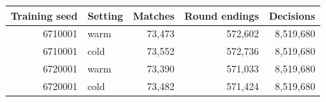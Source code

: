 \begin{tabular}{rlrrr}
\toprule
Training seed & Setting & Matches & Round endings & Decisions \\
\midrule
6710001 & warm & 73,473 & 572,602 & 8,519,680 \\
6710001 & cold & 73,552 & 572,736 & 8,519,680 \\
6720001 & warm & 73,390 & 571,033 & 8,519,680 \\
6720001 & cold & 73,482 & 571,424 & 8,519,680 \\
\bottomrule
\end{tabular}
